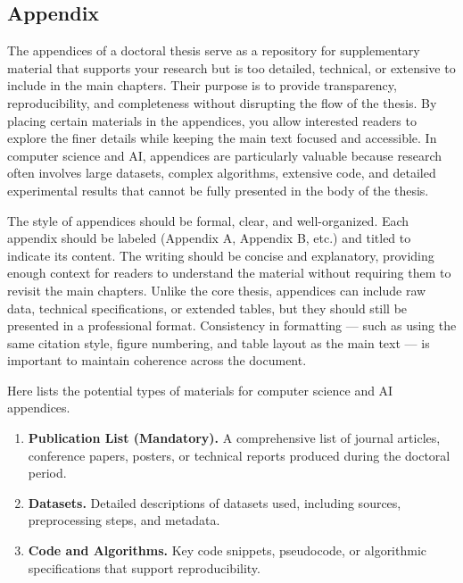 \documentclass[PCOM,Thesis,Review]{mpThesis}
\newcommand{\Hd}[1]{{\color{SteelBlue}\bf#1.}}
\begin{document}
\begin{Appendix}

\chapter{Appendix}
\label{app:appendix}

\begin{Remark}
The appendices of a doctoral thesis serve as a repository for supplementary material that supports your research but is too detailed, technical, or extensive to include in the main chapters.
Their purpose is to provide transparency, reproducibility, and completeness without disrupting the flow of the thesis.
By placing certain materials in the appendices, you allow interested readers to explore the finer details while keeping the main text focused and accessible.
In computer science and AI, appendices are particularly valuable because research often involves large datasets, complex algorithms, extensive code, and detailed experimental results
that cannot be fully presented in the body of the thesis.

The style of appendices should be formal, clear, and well-organized.
Each appendix should be labeled (Appendix A, Appendix B, etc.) and titled to indicate its content.
The writing should be concise and explanatory, providing enough context for readers to understand the material without requiring them to revisit the main chapters.
Unlike the core thesis, appendices can include raw data, technical specifications, or extended tables, but they should still be presented in a professional format.
Consistency in formatting --- such as using the same citation style, figure numbering, and table layout as the main text --- is important to maintain coherence across the document.

Here lists the potential types of materials for computer science and AI appendices.
\begin{enumerate}
\item \Hd{Publication List (Mandatory)}
A comprehensive list of journal articles, conference papers, posters, or technical reports produced during the doctoral period.

\item \Hd{Datasets}
Detailed descriptions of datasets used, including sources, preprocessing steps, and metadata.

\item \Hd{Code and Algorithms}
Key code snippets, pseudocode, or algorithmic specifications that support reproducibility.


\end{enumerate}
\end{Remark}
\end{Appendix}
\end{document}
